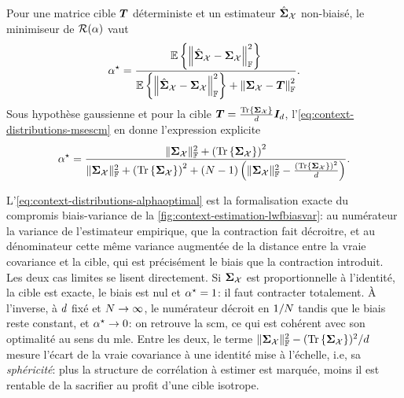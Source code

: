 \begin{proposition}
\label{prop:context-distributions-alphaoptimal}
  Pour une matrice cible $\boldsymbol{T}$ déterministe et un estimateur $\hat{\boldsymbol{\Sigma}}_{\mathcal{X}}$ non-biaisé, le minimiseur de $\mathcal{R}(\alpha)$ vaut
  \begin{equation}
    \alpha^\star
    =
    \frac{
      \operatorname{\mathbb{E}}\left\{\left\|\hat{\boldsymbol{\Sigma}}_{\mathcal{X}} - \boldsymbol{\Sigma}_{\mathcal{X}}\right\|_{\mathbb{F}}^2\right\}
    }{
      \operatorname{\mathbb{E}}\left\{\left\|\hat{\boldsymbol{\Sigma}}_{\mathcal{X}} - \boldsymbol{\Sigma}_{\mathcal{X}}\right\|_{\mathbb{F}}^2\right\}
      + \left\|\boldsymbol{\Sigma}_{\mathcal{X}} - \boldsymbol{T}\right\|_{\mathbb{F}}^2
    }.
    \label{eq:context-distributions-alphaoptimal}
  \end{equation}
  Sous hypothèse gaussienne et pour la cible $\boldsymbol{T} = \frac{\operatorname{\operatorname{Tr}}\left\{\boldsymbol{\Sigma}_{\mathcal{X}}\right\}}{d}\boldsymbol{I}_{d}$, l'\cref{eq:context-distributions-msescm} en donne l'expression explicite
  \begin{equation}
    \alpha^\star
    =
    \frac{
      \|\boldsymbol{\Sigma}_{\mathcal{X}}\|_{\mathbb{F}}^2 + \left(\operatorname{\operatorname{Tr}}\left\{\boldsymbol{\Sigma}_{\mathcal{X}}\right\}\right)^2
    }{
      \|\boldsymbol{\Sigma}_{\mathcal{X}}\|_{\mathbb{F}}^2 + \left(\operatorname{\operatorname{Tr}}\left\{\boldsymbol{\Sigma}_{\mathcal{X}}\right\}\right)^2
      + (N-1)\left(\|\boldsymbol{\Sigma}_{\mathcal{X}}\|_{\mathbb{F}}^2 - \frac{\left(\operatorname{\operatorname{Tr}}\left\{\boldsymbol{\Sigma}_{\mathcal{X}}\right\}\right)^2}{d}\right)
    }.
    \label{eq:context-distributions-alphaoptimalgauss}
  \end{equation}
\end{proposition}

L'\cref{eq:context-distributions-alphaoptimal} est la formalisation exacte du compromis biais-variance de la \cref{fig:context-estimation-lwfbiasvar}: au numérateur la variance de l'estimateur empirique, que la contraction fait décroitre, et au dénominateur cette même variance augmentée de la distance entre la vraie covariance et la cible, qui est précisément le biais que la contraction introduit. Les deux cas limites se lisent directement. Si $\boldsymbol{\Sigma}_{\mathcal{X}}$ est proportionnelle à l'identité, la cible est exacte, le biais est nul et $\alpha^\star=1$: il faut contracter totalement. À l'inverse, à $d$ fixé et $N\to\infty$, le numérateur décroit en $1/N$ tandis que le biais reste constant, et $\alpha^\star\to 0$: on retrouve la scm, ce qui est cohérent avec son optimalité au sens du mle. Entre les deux, le terme $\|\boldsymbol{\Sigma}_{\mathcal{X}}\|_{\mathbb{F}}^2 - (\operatorname{\operatorname{Tr}}\left\{\boldsymbol{\Sigma}_{\mathcal{X}}\right\})^2/d$ mesure l'écart de la vraie covariance à une identité mise à l'échelle, i.e, sa \emph{sphéricité}: plus la structure de corrélation à estimer est marquée, moins il est rentable de la sacrifier au profit d'une cible isotrope.

